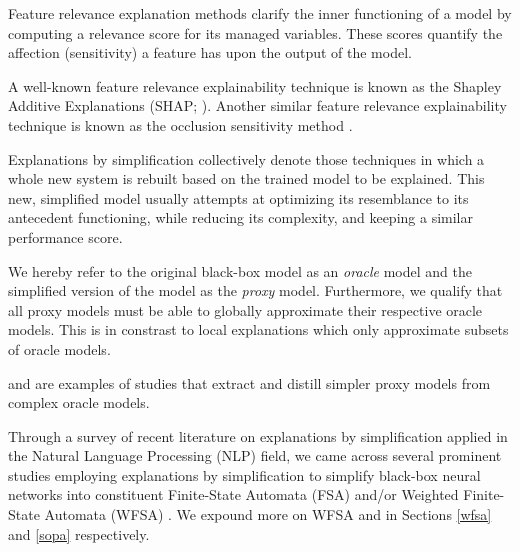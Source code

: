 \begin{definition}
  Feature relevance explanation methods clarify the inner functioning of a model by computing a relevance score for its managed variables. These scores quantify the affection (sensitivity) a feature has upon the output of the model.
\end{definition}

\begin{remark}
  A well-known feature relevance explainability technique is known as the Shapley Additive Explanations (SHAP; \citealt{lundberg2017unified}). Another similar feature relevance explainability technique is known as the occlusion sensitivity method \citep{zeiler2014visualizing}.
\end{remark}

\begin{definition}
  Explanations by simplification collectively denote those techniques in which a whole new system is rebuilt based on the trained model to be explained. This new, simplified model usually attempts at optimizing its resemblance to its antecedent functioning, while reducing its complexity, and keeping a similar performance score.
\end{definition}

\begin{remark}
  We hereby refer to the original black-box model as an \textit{oracle} model and the simplified version of the model as the \textit{proxy} model. Furthermore, we qualify that all proxy models must be able to globally approximate their respective oracle models. This is in constrast to local explanations which only approximate subsets of oracle models.
\end{remark}

\begin{remark}
  \citet{bastani2017interpretability} and \citet{tan2018distill} are examples of studies that extract and distill simpler proxy models from complex oracle models.
\end{remark}

Through a survey of recent literature on explanations by simplification applied in the Natural Language Processing (NLP) field, we came across several prominent studies employing explanations by simplification to simplify black-box neural networks into constituent Finite-State Automata (FSA) and/or Weighted Finite-State Automata (WFSA) \citep{schwartz2018sopa,peng2018rational,DBLP:journals/corr/abs-1905-08701,wang2019state,jiang2020cold}. We expound more on WFSA and \citet{schwartz2018sopa} in Sections \ref{wfsa} and \ref{sopa} respectively.

